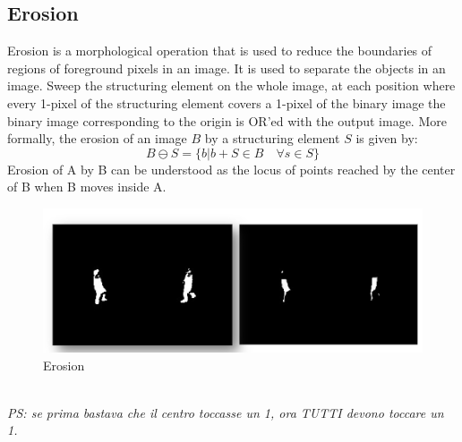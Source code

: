 \subsection{Erosion}
Erosion is a morphological operation that is used to reduce the boundaries of regions of foreground pixels in an image. It is used to separate the objects in an image.
Sweep the structuring element on the whole image, at each position where every 1-pixel of the structuring element covers a 1-pixel of the binary image the binary image corresponding to the origin is OR’ed with the output image. 
More formally, the erosion of an image $B$ by a structuring element $S$ is given by:
\[
    B \ominus S = \{b | b + S \in B \quad \forall s \in S\} 
\]
Erosion of A by B can be understood as the locus of points reached by the center of B when B moves inside A.
\begin{figure}[h]
    \centering
    \includegraphics[scale=0.5]{Figures/Erosion.png}
    \caption{Erosion}
    \label{fig:enter-label}
\end{figure}
\\
\textit{PS: se prima bastava che il centro toccasse un 1, ora TUTTI devono toccare un 1.}
